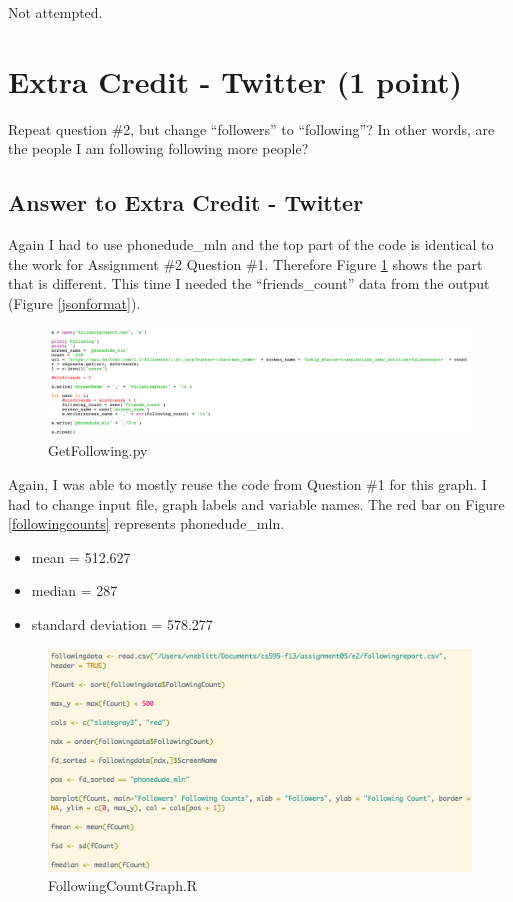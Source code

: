 \documentclass{article}
\begin{document}
Not attempted.

\clearpage

\section*{Extra Credit - Twitter (1 point)}

Repeat question \#2, but change ``followers'' to ``following''? In other words, are the people I am following following more people?

\subsection*{Answer to Extra Credit - Twitter}

Again I had to use phonedude\_mln and the top part of the code is identical to the work for Assignment \#2 Question \#1. Therefore Figure \ref{GetFollowingCode} shows the part that is different. This time I needed the ``friends\_count'' data from the output (Figure \ref{jsonformat}).

\begin{figure}[H]
\centering
\includegraphics[scale=0.25]{e2/GetFollowingCode}
\caption{GetFollowing.py}
\label{GetFollowingCode}
\end{figure}

Again, I was able to mostly reuse the code from Question \#1 for this graph. I had to change input file, graph labels and variable names. The red bar on Figure \ref{followingcounts} represents phonedude\_mln.

\begin{itemize}
\item mean = 512.627
\item median = 287
\item standard deviation = 578.277
\end{itemize}

\begin{figure}[H]
\centering
\includegraphics[scale=0.40]{e2/rscriptTfollowing}
\caption{FollowingCountGraph.R}
\label{followingcountgraph}
\end{figure}
\end{document}
